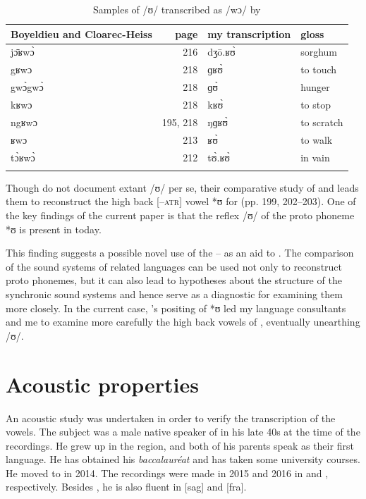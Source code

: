 \documentclass[output=paper,colorlinks,citecolor=brown]{langscibook}
\begin{document}
\begin{table}
\caption{Samples of /ʊ/ transcribed as /wɔ/ by \citet{BoyeldieuCloarec-Heiss2001}}
\label{tab:olson:9}
    \begin{tabularx}{\textwidth}{lrll}
    \lsptoprule
        Boyeldieu and Cloarec-Heiss & page & my transcription & gloss\\
    \midrule
        jɔ̄ʁwɔ̀ & 216 & dʒō.ʁʊ̀ & sorghum\\
        gʁwɔ & 218 & ɡʁʊ̀ & to touch\\
        gwɔ̀gwɔ̀ & 218 & ɡʊ̀ & hunger\\
        kʁwɔ & 218 & kʁʊ̀ & to stop\\
        ngʁwɔ & 195, 218 & ŋɡʁʊ̀ & to scratch\\
        ʁwɔ & 213 & ʁʊ̀ & to walk\\
        tɔ̀ʁwɔ̀ & 212 & tʊ̀.ʁʊ̀ & in vain\\
    \lspbottomrule
    \end{tabularx}
\end{table}

Though \citeauthor{BoyeldieuCloarec-Heiss2001} do not document extant /ʊ/ per se, their comparative study of  and  leads them to reconstruct the high back [–\textsc{atr}] vowel *ʊ for  (pp. 199, 202--203). One of the key findings of the current paper is that the reflex /ʊ/ of the proto phoneme *ʊ is present in  today.

This finding suggests a possible novel use of the  -- as an aid to . The comparison of the sound systems of related languages can be used not only to reconstruct proto phonemes, but it can also lead to hypotheses about the structure of the synchronic sound systems and hence serve as a diagnostic for examining them more closely. In the current case, \citeauthor{BoyeldieuCloarec-Heiss2001}'s positing of *ʊ led my language consultants and me to examine more carefully the high back vowels of , eventually unearthing /ʊ/.

\section{Acoustic properties}\label{sec:olson:3}

An acoustic study  was undertaken in order to verify the transcription of the  vowels. The subject was a male native speaker of  in his late 40s at the time of the recordings. He grew up in the  region, and both of his parents speak  as their first language. He has obtained his \textit{baccalauréat} and has taken some university courses. He moved to  in 2014. The recordings were made in 2015 and 2016 in  and , respectively. Besides , he is also fluent in  [sag] and  [fra].
\end{document}

